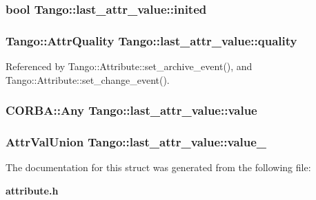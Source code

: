 \subsubsection[{inited}]{\setlength{\rightskip}{0pt plus 5cm}bool Tango\-::last\-\_\-attr\-\_\-value\-::inited}\label{structTango_1_1last__attr__value_a5c390677b08b00bafb0a2b1b095ac2ff}
\subsubsection[{quality}]{\setlength{\rightskip}{0pt plus 5cm}Tango\-::\-Attr\-Quality Tango\-::last\-\_\-attr\-\_\-value\-::quality}\label{structTango_1_1last__attr__value_a704042371c2de3dcb8814e71f8888eec}


Referenced by Tango\-::\-Attribute\-::set\-\_\-archive\-\_\-event(), and Tango\-::\-Attribute\-::set\-\_\-change\-\_\-event().

\subsubsection[{value}]{\setlength{\rightskip}{0pt plus 5cm}C\-O\-R\-B\-A\-::\-Any Tango\-::last\-\_\-attr\-\_\-value\-::value}\label{structTango_1_1last__attr__value_ac9380c5dfe9e38f8c1f4b35385127f69}
\subsubsection[{value\-\_\-4}]{\setlength{\rightskip}{0pt plus 5cm}Attr\-Val\-Union Tango\-::last\-\_\-attr\-\_\-value\-::value\-\_}\label{structTango_1_1last__attr__value_a2da098329f50e217705185215a817fd1}


The documentation for this struct was generated from the following file\-:\begin{DoxyCompactItemize}
\item 
{\bf attribute.\-h}\end{DoxyCompactItemize}
